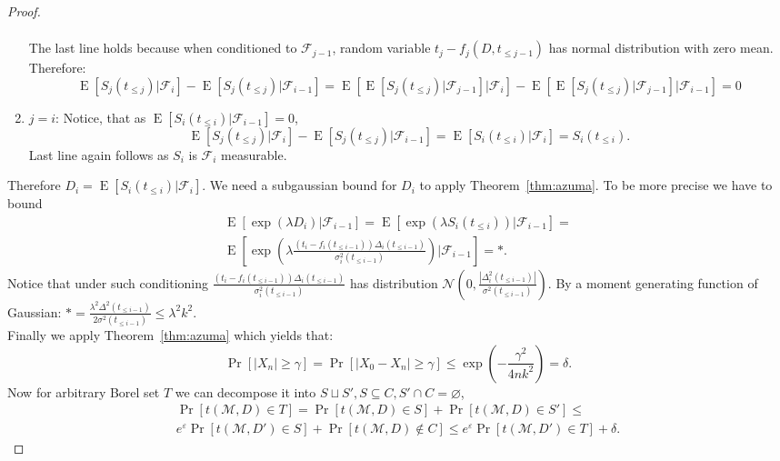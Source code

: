 \documentclass[12pt,letterpaper]{article}
\let\eps\varepsilon
\newcommand{\E}{\operatorname{E}}
\newcommand{\No}{\mathcal{N}}
\begin{document}
\begin{proof}
\begin{enumerate}
\begin{multline*}
 \end{multline*}
 The last line holds because when conditioned to $\mathcal{F}_{j - 1}$, random variable $t_j - f_j(D, t_{\leq j-1})$ has normal distribution with zero mean. Therefore:
 $$\E\left[S_{j}(t_{\leq j})|\mathcal{F}_{i}\right] - \E\left[S_{j}(t_{\leq j})|\mathcal{F}_{i-1}\right] = \E\left[\E\left[S_{j}(t_{\leq j})|\mathcal{F}_{j - 1}\right]| \mathcal{F}_{i}\right] - \E\left[\E\left[S_{j}(t_{\leq j})|\mathcal{F}_{j - 1}\right]| \mathcal{F}_{i - 1}\right] = 0$$
 \item $j = i$: Notice, that as $\E\left[S_{i}(t_{\leq i})|\mathcal{F}_{i-1}\right] = 0$,
 $$\E\left[S_{j}(t_{\leq j})|\mathcal{F}_{i}\right] - \E\left[S_{j}(t_{\leq j})|\mathcal{F}_{i-1}\right] = \E\left[S_{i}(t_{\leq i})|\mathcal{F}_{i}\right] = S_{i}(t_{\leq i}).$$
 Last line again follows as $S_i$ is $\mathcal{F}_{i}$ measurable.
\end{enumerate}
Therefore $D_i = \E\left[S_{i}(t_{\leq i})|\mathcal{F}_{i}\right]$. We need a subgaussian bound for $D_i$ to apply Theorem~\ref{thm:azuma}. To be more precise we have to bound
\begin{multline*}
  \E\left[\exp(\lambda D_i)|\mathcal{F}_{i - 1}\right] = \E\left[\exp(\lambda S_i(t_{\leq i}))|\mathcal{F}_{i - 1}\right] = \\
  \E\left[\exp\left(\lambda \frac{(t_i - f_i(t_{\leq i - 1}))\Delta_i(t_{\leq i - 1})}{\sigma^2_{i}(t_{\leq i - 1})}\right)|\mathcal{F}_{i - 1}\right] = *.
\end{multline*}
Notice that under such conditioning $\frac{(t_i - f_i(t_{\leq i - 1}))\Delta_i(t_{\leq i - 1})}{\sigma^2_{i}(t_{\leq i - 1})}$ has distribution $\No(0, \frac{|\Delta^2_i(t_{\leq i - 1})|}{\sigma^2(t_{\leq i - 1})})$. By a moment generating function of Gaussian:
$* = \frac{\lambda^2\Delta^2(t_{\leq i - 1})}{2\sigma^2(t_{\leq i - 1})} \leq \lambda^2k^2$.\\
Finally we apply Theorem~\ref{thm:azuma} which yields that:
$$\Pr[|X_n| \geq \gamma] = \Pr[|X_0 - X_n| \geq \gamma] \leq \exp\left(-\frac{\gamma^2}{4nk^2}\right) = \delta.$$
Now for arbitrary Borel set $T$ we can decompose it into $S \sqcup S', S \subseteq C, S' \cap C = \varnothing$,
\begin{multline*}
\Pr[t(\mathcal{M}, D) \in T] = \Pr[t(\mathcal{M}, D) \in S] + \Pr[t(\mathcal{M}, D) \in S'] \leq\\
 e^{\eps}\Pr[t(\mathcal{M}, D') \in S] + \Pr[t(\mathcal{M}, D) \not\in C] \leq e^{\eps}\Pr[t(\mathcal{M}, D') \in T] + \delta.
\end{multline*}
\end{proof}
\end{document}
